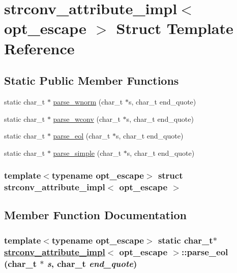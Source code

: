 \hypertarget{structstrconv__attribute__impl}{
\section{strconv\_\-attribute\_\-impl$<$ opt\_\-escape $>$ Struct Template Reference}
\label{structstrconv__attribute__impl}
}
\subsection*{Static Public Member Functions}
\begin{CompactItemize}
\item 
static char\_\-t $\ast$ \hyperlink{structstrconv__attribute__impl_9b7f8b1e860c5d022dbd29f9a89e9e27}{parse\_\-wnorm} (char\_\-t $\ast$s, char\_\-t end\_\-quote)
\item 
static char\_\-t $\ast$ \hyperlink{structstrconv__attribute__impl_2d39998b79896af7c53c5f3dc22a526b}{parse\_\-wconv} (char\_\-t $\ast$s, char\_\-t end\_\-quote)
\item 
static char\_\-t $\ast$ \hyperlink{structstrconv__attribute__impl_0f57ee9d69b9d626765f4a9c8af6df2e}{parse\_\-eol} (char\_\-t $\ast$s, char\_\-t end\_\-quote)
\item 
static char\_\-t $\ast$ \hyperlink{structstrconv__attribute__impl_8358dc980178e55c8669b9dcd04872d7}{parse\_\-simple} (char\_\-t $\ast$s, char\_\-t end\_\-quote)
\end{CompactItemize}
\subsubsection*{template$<$typename opt\_\-escape$>$ struct strconv\_\-attribute\_\-impl$<$ opt\_\-escape $>$}



\subsection{Member Function Documentation}
\hypertarget{structstrconv__attribute__impl_0f57ee9d69b9d626765f4a9c8af6df2e}{
\subsubsection[parse\_\-eol]{\setlength{\rightskip}{0pt plus 5cm}template$<$typename opt\_\-escape$>$ static char\_\-t$\ast$ \hyperlink{structstrconv__attribute__impl}{strconv\_\-attribute\_\-impl}$<$ opt\_\-escape $>$::parse\_\-eol (char\_\-t $\ast$ {\em s}, char\_\-t {\em end\_\-quote})}}
\label{structstrconv__attribute__impl_0f57ee9d69b9d626765f4a9c8af6df2e}


